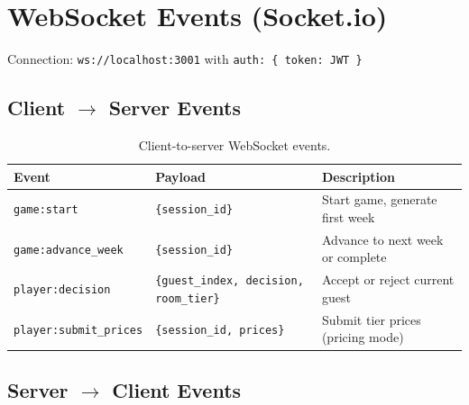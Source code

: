 \documentclass[12pt,a4paper,openany]{report}
\begin{document}
\section{WebSocket Events (Socket.io)}

Connection: \texttt{ws://localhost:3001} with \texttt{auth: \{ token: JWT \}}

\subsection{Client $\rightarrow$ Server Events}

\begin{table}[H]
\centering
\caption{Client-to-server WebSocket events.}
\label{tab:c2sevents}
\small
\begin{tabular}{@{}lll@{}}
\toprule
\textbf{Event} & \textbf{Payload} & \textbf{Description} \\
\midrule
\texttt{game:start}           & \texttt{\{session\_id\}}              & Start game, generate first week \\
\texttt{game:advance\_week}   & \texttt{\{session\_id\}}              & Advance to next week or complete \\
\texttt{player:decision}      & \texttt{\{guest\_index, decision, room\_tier\}} & Accept or reject current guest \\
\texttt{player:submit\_prices}& \texttt{\{session\_id, prices\}}      & Submit tier prices (pricing mode) \\
\bottomrule
\end{tabular}
\end{table}

\subsection{Server $\rightarrow$ Client Events}
\end{document}
